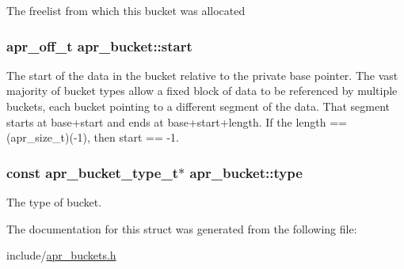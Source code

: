 The freelist from which this bucket was allocated \hypertarget{structapr__bucket_a4a8791b606b3ad613b8672ec94145628}{
\subsubsection[{start}]{\setlength{\rightskip}{0pt plus 5cm}apr\-\_\-off\-\_\-t apr\-\_\-bucket\-::start}}\label{structapr__bucket_a4a8791b606b3ad613b8672ec94145628}
The start of the data in the bucket relative to the private base pointer. The vast majority of bucket types allow a fixed block of data to be referenced by multiple buckets, each bucket pointing to a different segment of the data. That segment starts at base+start and ends at base+start+length. If the length == (apr\-\_\-size\-\_\-t)(-\/1), then start == -\/1. \hypertarget{structapr__bucket_ac27fa5ce798e688ad243ebe1615937fc}{
\subsubsection[{type}]{\setlength{\rightskip}{0pt plus 5cm}const {\bf apr\-\_\-bucket\-\_\-type\-\_\-t}$\ast$ apr\-\_\-bucket\-::type}}\label{structapr__bucket_ac27fa5ce798e688ad243ebe1615937fc}
The type of bucket. 

The documentation for this struct was generated from the following file\-:\begin{DoxyCompactItemize}
\item 
include/\hyperlink{apr__buckets_8h}{apr\-\_\-buckets.\-h}\end{DoxyCompactItemize}
